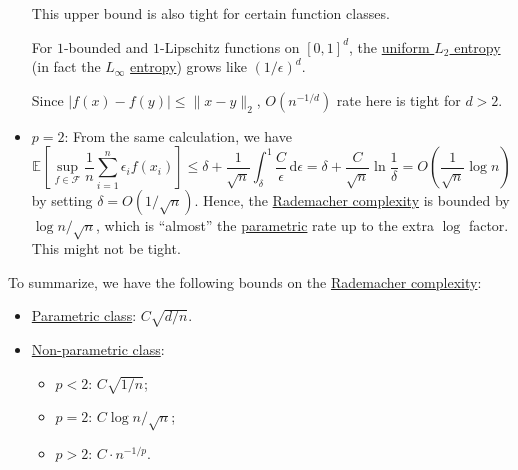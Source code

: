 \begin{itemize}
	      This upper bound is also tight for certain function classes.
	      \begin{eg}
		      For \(1\)-bounded and \(1\)-Lipschitz functions on \([0, 1]^d\), the \hyperref[def:Koltchinskii-Pollard-entropy]{uniform \(L_2\) entropy} (in fact the \(L_\infty \) \hyperref[def:metric-entropy]{entropy}) grows like \((1 / \epsilon )^d\).
	      \end{eg}
	      \begin{explanation}
		      Since \(\vert f(x) - f(y) \vert \leq \lVert x - y \rVert _2\), \(O(n^{-1 / d})\) rate here is tight for \(d > 2\).
	      \end{explanation}
	\item \(p = 2\): From the same calculation, we have
	      \[
		      \mathbb{E}_{}\left[\sup _{f\in \mathscr{F} } \frac{1}{n}\sum_{i=1}^{n} \epsilon _i f(x_i) \right]
		      \leq \delta + \frac{1}{\sqrt{n} } \int_{\delta }^{1} \frac{C}{\epsilon } \,\mathrm{d}\epsilon
		      = \delta + \frac{C}{\sqrt{n} } \ln \frac{1}{\delta}
		      = O\left( \frac{1}{\sqrt{n} } \log n \right)
	      \]
	      by setting \(\delta = O(1 / \sqrt{n} )\). Hence, the \hyperref[def:Rademacher-complexity]{Rademacher complexity} is bounded by \(\log n / \sqrt{n} \), which is ``almost'' the \hyperref[def:parametric]{parametric} rate up to the extra \(\log \) factor. This might not be tight.
\end{itemize}

\begin{remark}
	To summarize, we have the following bounds on the \hyperref[def:Rademacher-complexity]{Rademacher complexity}:
	\begin{itemize}
		\item \hyperref[def:parametric]{Parametric class}: \(C \sqrt{d / n} \).
		\item \hyperref[def:non-parametric]{Non-parametric class}:
		      \begin{itemize}
			      \item \(p < 2\): \(C \sqrt{1 / n} \);
			      \item \(p = 2\): \(C \log n / \sqrt{n} \);
			      \item \(p > 2\): \(C \cdot n^{-1 / p}\).
		      \end{itemize}
	\end{itemize}
\end{remark}

